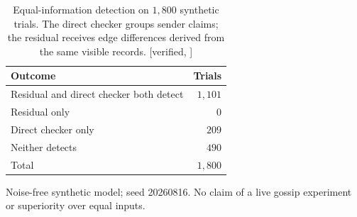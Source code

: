 \begin{table}[H]
\centering
\caption{Equal-information detection on $1{,}800$ synthetic trials.
The direct checker groups sender claims; the residual receives edge
 differences derived from the same visible records. [verified,
\protect{}]}
\label{tab:fh-sheaf-harness}
\small
\renewcommand{\arraystretch}{1.15}
\begin{tabularx}{\linewidth}{@{}>{\raggedright\arraybackslash}X r@{}}
\toprule
\textbf{Outcome} & \textbf{Trials} \\
\midrule
Residual and direct checker both detect & $1{,}101$ \\
Residual only & $0$ \\
Direct checker only & $209$ \\
Neither detects & $490$ \\
\midrule
Total & $1{,}800$ \\
\bottomrule
\end{tabularx}\par
\vspace{6pt}
\noindent\footnotesize Noise-free synthetic model; seed 20260816.
No claim of a live gossip experiment or superiority over equal inputs.\par
\end{table}
